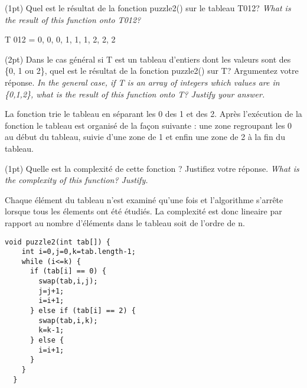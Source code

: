 \documentclass[10pt]{article}\usepackage[nu]{esial}
\begin{document}
\noindent\begin{minipage}{.69\linewidth}


\Question(1pt) Quel est le résultat de la fonction puzzle2() sur le tableau
  T012?  \textit{What is the result of this function onto T012?}
\begin{Reponse}
  T 012 = {0, 0, 0, 1, 1, 1, 2, 2, 2}  
\end{Reponse}

\Question(2pt) Dans le cas général si T est un tableau d'entiers dont les
valeurs sont des \{0, 1 ou 2\}, quel est le résultat de la fonction puzzle2()
sur T?  Argumentez votre réponse. \textit{In the general case, if T is an array
  of integers which values are in \{0,1,2\}, what is the result of this
  function onto T? Justify your answer.}

\begin{Reponse}
  La fonction trie le tableau en séparant les 0 des 1 et des 2. Après
  l'exécution  de la fonction le tableau est organisé de la
  façon suivante : une zone regroupant les 0 au début du tableau,
  suivie d'une zone de 1 et enfin une zone de 2 à  la fin du
  tableau.
\end{Reponse}

\Question(1pt) Quelle est la complexité de cette fonction ? Justifiez votre
réponse.  \textit{What is the complexity of this function? Justify.}
\begin{Reponse}
  Chaque élément du tableau n'est examiné qu'une fois et l'algorithme s'arrête
  lorsque tous les élements ont été étudiés. La complexité est donc lineaire
  par rapport au nombre d'éléments dans le tableau soit de l'ordre de n.
\end{Reponse}

\end{minipage}\hfill\begin{minipage}{.28\linewidth}
\begin{Verbatim}[gobble=2,numbers=right]
  void puzzle2(int tab[]) {
    int i=0,j=0,k=tab.length-1;
    while (i<=k) {
      if (tab[i] == 0) {
        swap(tab,i,j);
        j=j+1;
        i=i+1;
      } else if (tab[i] == 2) {
        swap(tab,i,k);
        k=k-1;
      } else {
        i=i+1;
      }
    }
  }
\end{Verbatim}
\end{minipage}
\end{document}
